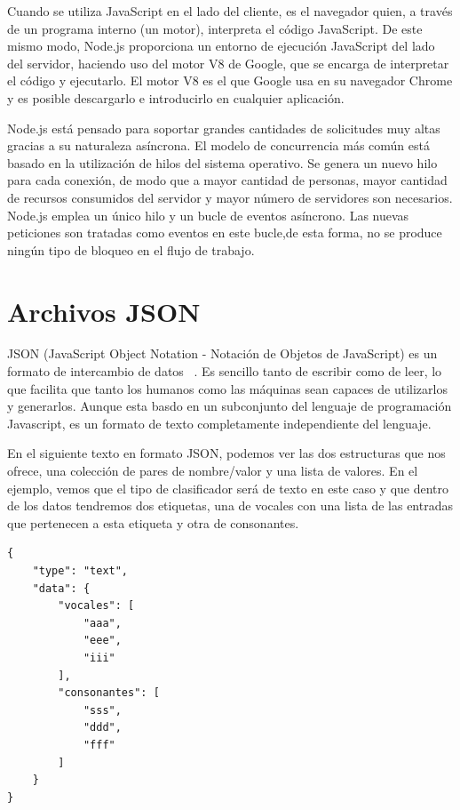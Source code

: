 \documentclass[a4paper, 12pt]{book}
\begin{document}
Cuando se utiliza JavaScript en el lado del cliente, es el navegador quien, a través de un programa interno (un motor), interpreta el código JavaScript. De este mismo modo, Node.js proporciona un entorno de ejecución JavaScript del lado del servidor, haciendo uso del motor V8 de Google, que se encarga de interpretar el código y ejecutarlo.
El motor V8 es el que Google usa en su navegador Chrome y es posible descargarlo e introducirlo en cualquier aplicación.

Node.js está pensado para soportar grandes cantidades de solicitudes muy altas gracias a su naturaleza asíncrona. El modelo de concurrencia más común está basado en la utilización de hilos del sistema operativo. Se genera un nuevo hilo para cada conexión, de modo que a mayor cantidad de personas, mayor cantidad de recursos consumidos del servidor y mayor número de servidores son necesarios. Node.js emplea un único hilo y un bucle de eventos asíncrono. Las nuevas peticiones son tratadas como eventos en este bucle,de esta forma, no se produce ningún tipo de bloqueo en el flujo de trabajo.

\section{Archivos JSON} 
\label{sec:archivosjson}

JSON (JavaScript Object Notation - Notación de Objetos de JavaScript) es un formato de intercambio de datos ~\cite{json}. Es sencillo tanto de escribir como de leer, lo que facilita que tanto los humanos como las máquinas sean capaces de utilizarlos y generarlos. Aunque esta basdo en un subconjunto del lenguaje de programación Javascript, es un formato de texto completamente independiente del lenguaje.

En el siguiente texto en formato JSON, podemos ver las dos estructuras que nos ofrece, una colección de pares de nombre/valor y una lista de valores. En el ejemplo, vemos que el tipo de clasificador será de texto en este caso y que dentro de los datos tendremos dos etiquetas, una de vocales con una lista de las entradas que pertenecen a esta etiqueta y otra de consonantes. 

\begin{verbatim}
{
    "type": "text",
    "data": {
        "vocales": [
            "aaa",
            "eee",
            "iii"
        ],
        "consonantes": [
            "sss",
            "ddd",
            "fff"
        ]
    }
}
\end{verbatim}
\end{document}
